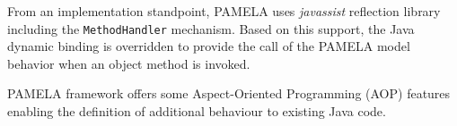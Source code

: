 From an implementation standpoint, PAMELA uses \emph{javassist} reflection library including the \texttt{MethodHandler} mechanism. Based on this support, the Java dynamic binding is overridden to provide the call of the PAMELA model behavior when an object method is invoked. 



PAMELA framework offers some Aspect-Oriented Programming (AOP) features enabling the definition of additional behaviour to existing Java code. 



